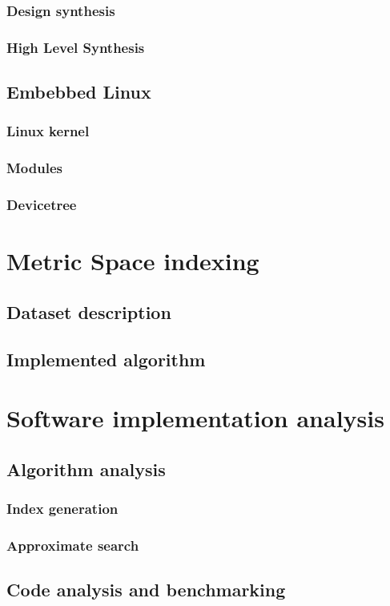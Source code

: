 \documentclass{iccmemoria}
\begin{document}
    \subsection{Design synthesis}
    \subsection{High Level Synthesis}
  \section{Embebbed Linux}
    \subsection{Linux kernel}
    \subsection{Modules}
    \subsection{Devicetree}

\chapter{Metric Space indexing}
  \section{Dataset description}
  \section{Implemented algorithm}

\chapter{Software implementation analysis}
  \section{Algorithm analysis}
    \subsection{Index generation}
    \subsection{Approximate search}
  \section{Code analysis and benchmarking} 
\end{document}

